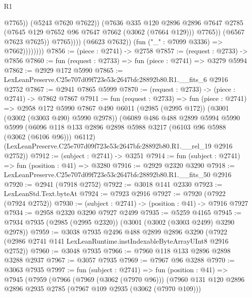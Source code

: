\begin{lexlean}{R1}
\begin{coremodule}
                                      @7765))
                                  (@5243 @7620 @7622))
                                (@7636
                                  @335
                                  @120
                                  @2896
                                  @2896
                                  @7647
                                  @2785
                                  (@7645 @129 @7652 @96 @7647 @7662 (@3062 (@7664 @129)))
                                  @7765))
                              (@6567 @7623 @7625))
                            @7765))))
                    (@6623 @7632))
                  (fun ("_" : @7099 @3336) => @7662))))))))
@7856 := (piece : @2741) -> @2758
@7857 := (request : @2733) -> @7856
@7860 := fun (request : @2733) => fun (piece : @2741) => @3279 @5994
@7862 := @2929 @172 @5990
@7865 := LexLeanPreserve.C25e707d09f723e53c2647bfc28892b80.R1.__fits_6 @2916 @2752
@7867 := @2941 @7865 @5999
@7870 := (request : @2733) -> (piece : @2741) -> @7862 @7867
@7911 := fun (request : @2733) =>
  fun (piece : @2741) =>
  @2958
    @172
    @5990
    @7867
    @490
    @6011
    (@2985 (@2995 @172))
    (@3001 (@3002 (@3003 @490) @5990 @2978))
    (@6089
      @486
      @488
      @2899
      @5994
      @5990
      @5999
      (@6096 @118 @133 @2896 @2898 @5988 @3217 (@6103 @96 @5988 (@3062 (@6106 @96))) @6112)
      (LexLeanPreserve.C25e707d09f723e53c2647bfc28892b80.R1.__rel_19 @2916 @2752))
@7912 := (subject : @2741) -> @3251
@7914 := fun (subject : @2741) => fun (position : @41) => @3280
@7916 := @2929 @2320 @3290
@7918 := LexLeanPreserve.C25e707d09f723e53c2647bfc28892b80.R1.__fits_50 @2916
@7920 := @2941 (@7918 @2752)
@7922 := @3018 @141 @2330
@7923 := LexLeanStd.Text.byteAt
@7924 := @7923 @2916
@7927 := @7920 (@7922 (@7924 @2752))
@7930 := (subject : @2741) -> (position : @41) -> @7916 @7927
@7934 := @2958 @2320 @3290 @7927 @2499
@7935 := @5259 @4165
@7945 := @7934 @7935 (@2985 (@2995 @2320)) (@3001 (@3002 (@3003 @2499) @3290 @2978))
@7959 := @3038
    @7935
    @2496
    @488
    @2899
    @2896
    @3290
    (@7922 (@2986 @2741 @141 LexLeanRuntime.instIndexableByteArrayUInt8 @2916 @2752))
@7960 := @3048 @7935
@7966 := @7960 @118 @133 @2896 @2898 @3288 @2937
@7967 := @3057 @7935
@7969 := @7967 @96 @3288
@7970 := @3063 @7935
@7997 := fun (subject : @2741) =>
  fun (position : @41) =>
  @7945
    (@7959
      (@7966
        (@7969 (@3062 (@7970 @96)))
        (@7960
          @131
          @120
          @2896
          @2896
          @2935
          @2785
          (@7967 @109 @2935 (@3062 (@7970 @109)))

\end{coremodule}
\end{lexlean}
